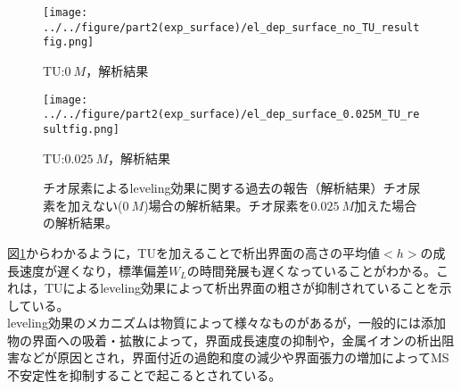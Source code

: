 \documentclass[autodetect-engine,dvi=dvipdfmx,a4paper,ja=standard,oneside,openany,11pt,draft]{bxjsbook}
\begin{document}
\begin{figure}[H]
  \begin{minipage}
    {0.5\textwidth}
    \centering
    \texttt{[image: ../../figure/part2(exp\_surface)/el\_dep\_surface\_no\_TU\_resultfig.png]}
    \caption{TU:$\SI{0}{M}$，解析結果}
    \label{fig:no_leveling_effect_result}
  \end{minipage}
  \begin{minipage}
    {0.5\textwidth}
    \centering
    \texttt{[image: ../../figure/part2(exp\_surface)/el\_dep\_surface\_0.025M\_TU\_resultfig.png]}
    \caption{TU:$\SI{0.025}{M}$，解析結果}
    \label{fig:leveling_effect_result}
  \end{minipage}
  \caption{チオ尿素によるleveling効果に関する過去の報告（解析結果）\cite{schilardi1998evolution}チオ尿素を加えない($\SI{0}{M}$)場合の解析結果。チオ尿素を$\SI{0.025}{M}$加えた場合の解析結果。}
  \label{fig:leveling_result}
\end{figure}
図\ref{fig:leveling_result}からわかるように，TUを加えることで析出界面の高さの平均値$<h>$の成長速度が遅くなり，標準偏差$W_L$の時間発展も遅くなっていることがわかる。これは，TUによるleveling効果によって析出界面の粗さが抑制されていることを示している。\\
leveling効果のメカニズムは物質によって様々なものがある\cite{めっき添加剤の作用機構と表面形状制御}が，一般的には添加物の界面への吸着・拡散によって，界面成長速度の抑制や，金属イオンの析出阻害などが原因とされ\cite{oniciu1991some}，界面付近の過飽和度の減少や界面張力の増加によってMS不安定性を抑制することで起こるとされている。
\ifdraft{
  
  
}{}
\end{document}

